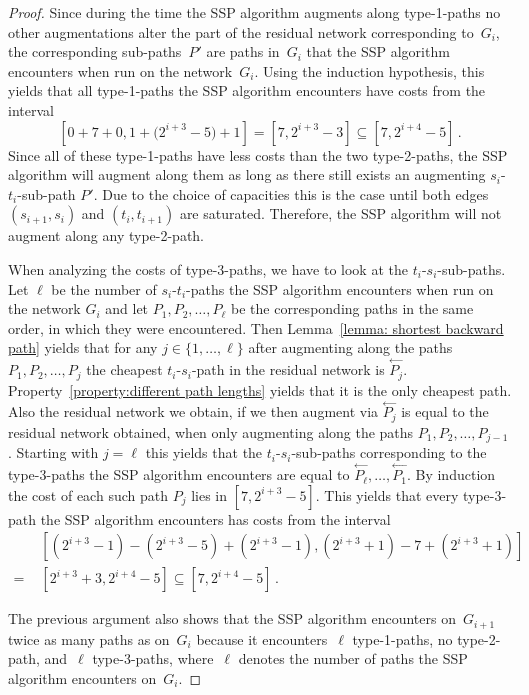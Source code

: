 \documentclass[11pt]{article}
\newcommand{\DOT}{\,.}
\begin{document}
\begin{proof}
Since during the time the SSP algorithm augments along type-1-paths no other
augmentations alter the part of the residual network corresponding to~$G_{i}$,
the corresponding sub-paths~$P'$ are paths in~$G_{i}$ that the
SSP algorithm encounters when run on the network~$G_i$.
Using the induction hypothesis, this yields that all type-1-paths the SSP algorithm encounters have costs
from the interval
\[
   [0 + 7 + 0,1 + \big(2^{i+3}-5\big) + 1] = [7, 2^{i+3}-3] \subseteq [7, 2^{i+4}-5] \DOT
\]
Since all of these type-1-paths have less costs than the two type-2-paths, the
SSP algorithm will augment along them as long as there still exists an
augmenting $s_{i}$-$t_{i}$-sub-path $P'$. Due to the choice of capacities this is
the case until both edges $(s_{i+1},s_{i})$ and $(t_{i},t_{i+1})$ are saturated.
Therefore, the SSP algorithm will not augment along any type-2-path.

When analyzing the costs of type-3-paths, we have to look at the $t_i$-$s_i$-sub-paths.
Let $\ell$ be the number of $s_i$-$t_i$-paths the SSP algorithm encounters when
run on the network $G_i$ and let $P_1,P_2,\ldots,P_{\ell}$ be the corresponding paths
in the same order, in which they were encountered.
Then Lemma~\ref{lemma: shortest backward path} yields that for any $j \in
\{1,\ldots,{\ell}\}$ after augmenting along the paths $P_1,P_2,\ldots,P_j$ the cheapest
$t_i$-$s_i$-path in the residual network is $\stackrel{\leftarrow}{P_j}$. Property~\ref{property:different path lengths} yields that it is the only cheapest path. Also
the residual network we obtain, if we then augment via
$\stackrel{\leftarrow}{P_j}$ is equal to the residual network obtained, when
only augmenting along the paths $P_1,P_2,\ldots,P_{j-1}$. Starting with $j={\ell}$ this
yields that the $t_i$-$s_i$-sub-paths corresponding to the type-3-paths the SSP
algorithm encounters are equal to
$\stackrel{\leftarrow}{P_{\ell}},\ldots,\stackrel{\leftarrow}{P_1}$.
By induction the cost of each such path $P_j$ lies in $[7, 2^{i+3}-5]$. This
yields that every type-3-path the SSP algorithm encounters has costs from the interval
\begin{align*}
& [(2^{i+3} - 1) - (2^{i+3}-5)  + (2^{i+3} - 1), (2^{i+3} + 1)- 7 + (2^{i+3} + 1)] \\
 = \,\, & [2^{i+3} + 3, 2^{i+4} - 5] \subseteq [7, 2^{i+4}-5] \DOT
\end{align*}

The previous argument also shows that the SSP algorithm encounters on~$G_{i+1}$ twice as many paths as on~$G_i$
because it encounters~$\ell$ type-1-paths, no type-2-path, and~$\ell$ type-3-paths, where~$\ell$ denotes the
number of paths the SSP algorithm encounters on~$G_i$. 
\end{proof}
\end{document}
